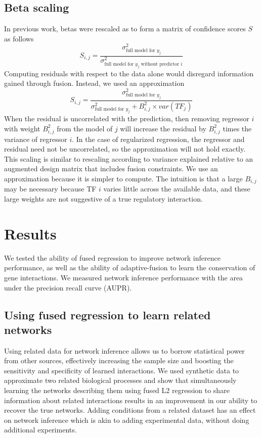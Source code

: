 \documentclass[11pt]{article}
\begin{document}
\subsection{Beta scaling}
In previous work, betas were rescaled as to form a matrix of confidence scores $S$ as follows
\begin{equation}
S_{i,j} = \frac{\sigma^2_{\text{full model for }y_j}}{\sigma^2_{\text{full model for }y_j \text{ without predictor }i}}
\end{equation}
Computing residuals with respect to the data alone would disregard information gained through fusion. Instead, we used an approximation
\begin{equation}
S_{i,j} = \frac{\sigma^2_{\text{full model for }y_j}}{\sigma^2_{\text{full model for }y_j} + B_{i,j}^2 \times var(TF_j)}
\end{equation}
When the residual is uncorrelated with the prediction, then removing regressor $i$ with weight $B_{i,j}^2$ from the model of $j$ will increase the residual by $B_{i,j}^2$ times the variance of regressor $i$. In the case of regularized regression, the regressor and residual need not be uncorrelated, so the approximation will not hold exactly. This scaling is similar to rescaling according to variance explained relative to an augmented design matrix that includes fusion constraints. We use an approximation because it is simpler to compute. The intuition is that a large $B_{i,j}$ may be necessary because TF $i$ varies little across the available data, and these large weights are not suggestive of a true regulatory interaction.

\section{Results}
We tested the ability of fused regression to improve network inference performance, as well as the ability of adaptive-fusion to learn the conservation of gene interactions. We measured network inference performance with the area under the precision recall curve (AUPR). 

\subsection{Using fused regression to learn related networks}
Using related data for network inference allows us to borrow statistical power from other sources, effectively increasing the sample size and boosting the sensitivity and specificity of learned interactions. We used synthetic data to approximate two related biological processes and show that simultaneously learning the networks describing them using fused L2 regression to share information about related interactions results in an improvement in our ability to recover the true networks. Adding conditions from a related dataset has an effect on network inference which is akin to adding experimental data, without doing additional experiments.  
\end{document}
